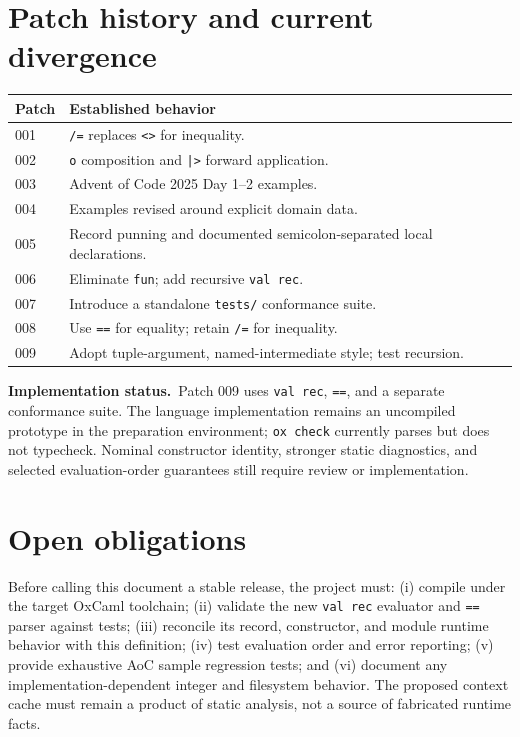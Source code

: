 \documentclass[11pt,oneside,openany]{book}
\newcommand{\kw}[1]{\texttt{#1}}
\newcommand{\impl}{\textbf{Implementation status.}\ }
\begin{document}
\section{Patch history and current divergence}
\begin{center}
\small
\begin{tabularx}{\linewidth}{@{}l X@{}}
\toprule
Patch & Established behavior \\
\midrule
001 & \kw{/=} replaces \kw{<>} for inequality.\\
002 & \kw{o} composition and \kw{|>} forward application.\\
003 & Advent of Code 2025 Day 1--2 examples.\\
004 & Examples revised around explicit domain data.\\
005 & Record punning and documented semicolon-separated local declarations.\\
006 & Eliminate \kw{fun}; add recursive \kw{val rec}.\\
007 & Introduce a standalone \kw{tests/} conformance suite.\\
008 & Use \kw{==} for equality; retain \kw{/=} for inequality.\\
009 & Adopt tuple-argument, named-intermediate style; test recursion.\\
\bottomrule
\end{tabularx}
\end{center}
\impl Patch 009 uses \kw{val rec}, \kw{==}, and a separate conformance suite. The language implementation remains an uncompiled prototype in the preparation environment; \kw{ox check} currently parses but does not typecheck. Nominal constructor identity, stronger static diagnostics, and selected evaluation-order guarantees still require review or implementation.

\section{Open obligations}
Before calling this document a stable release, the project must: (i) compile under the target OxCaml toolchain; (ii) validate the new \kw{val rec} evaluator and \kw{==} parser against tests; (iii) reconcile its record, constructor, and module runtime behavior with this definition; (iv) test evaluation order and error reporting; (v) provide exhaustive AoC sample regression tests; and (vi) document any implementation-dependent integer and filesystem behavior. The proposed context cache must remain a product of static analysis, not a source of fabricated runtime facts.
\end{document}
